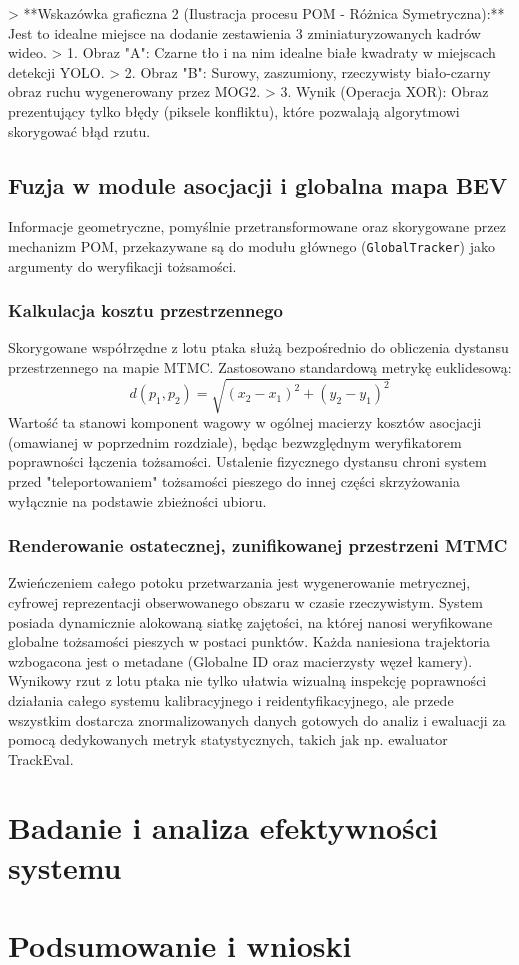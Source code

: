 > **Wskazówka graficzna 2 (Ilustracja procesu POM - Różnica Symetryczna):** Jest to idealne miejsce na dodanie zestawienia 3 zminiaturyzowanych kadrów wideo.
> 1. Obraz "A": Czarne tło i na nim idealne białe kwadraty w miejscach detekcji YOLO.
> 2. Obraz "B": Surowy, zaszumiony, rzeczywisty biało-czarny obraz ruchu wygenerowany przez MOG2.
> 3. Wynik (Operacja XOR): Obraz prezentujący tylko błędy (piksele konfliktu), które pozwalają algorytmowi skorygować błąd rzutu.

\section{Fuzja w module asocjacji i globalna mapa BEV}

Informacje geometryczne, pomyślnie przetransformowane oraz skorygowane przez mechanizm POM,
przekazywane są do modułu głównego (\texttt{GlobalTracker}) jako argumenty do weryfikacji
tożsamości.

\subsection{Kalkulacja kosztu przestrzennego}

Skorygowane współrzędne z lotu ptaka służą bezpośrednio do obliczenia dystansu przestrzennego na
mapie MTMC. Zastosowano standardową metrykę euklidesową: $$ d(p_1, p_2) = \sqrt{(x_2 - x_1)^2 +
    (y_2 - y_1)^2} $$ Wartość ta stanowi komponent wagowy w ogólnej macierzy kosztów asocjacji
(omawianej w poprzednim rozdziale), będąc bezwzględnym weryfikatorem poprawności łączenia
tożsamości. Ustalenie fizycznego dystansu chroni system przed "teleportowaniem" tożsamości pieszego
do innej części skrzyżowania wyłącznie na podstawie zbieżności ubioru.

\subsection{Renderowanie ostatecznej, zunifikowanej przestrzeni MTMC}

Zwieńczeniem całego potoku przetwarzania jest wygenerowanie metrycznej, cyfrowej reprezentacji
obserwowanego obszaru w czasie rzeczywistym. System posiada dynamicznie alokowaną siatkę zajętości,
na której nanosi weryfikowane globalne tożsamości pieszych w postaci punktów. Każda naniesiona
trajektoria wzbogacona jest o metadane (Globalne ID oraz macierzysty węzeł kamery). Wynikowy rzut z
lotu ptaka nie tylko ułatwia wizualną inspekcję poprawności działania całego systemu kalibracyjnego
i reidentyfikacyjnego, ale przede wszystkim dostarcza znormalizowanych danych gotowych do analiz i
ewaluacji za pomocą dedykowanych metryk statystycznych, takich jak np. ewaluator TrackEval.

\chapter{Badanie i analiza efektywności systemu}\label{chap:badanie_efektywności}
\chapter{Podsumowanie i wnioski}\label{chap:podsumowanie}

